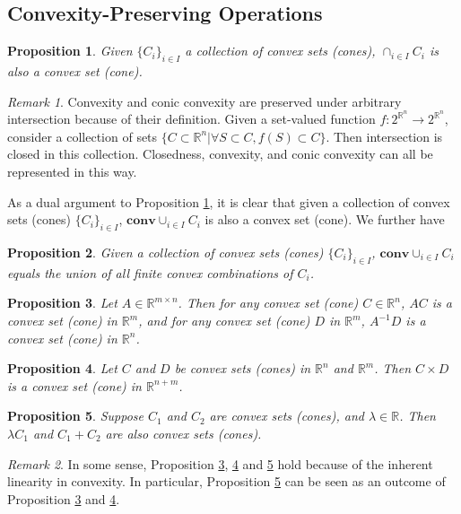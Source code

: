 \documentclass[openany]{book}
\newtheorem{proposition}{Proposition}[chapter]
\theoremstyle{definition}
\theoremstyle{remark}
\newtheorem*{remark}{Remark}
\begin{document}
\subsection{Convexity-Preserving Operations}
\begin{proposition}\label{prop:convIntersect}
    Given $\{C_i\}_{i\in I}$ a collection of convex sets (cones), $\cap_{i\in I}C_i$ is also a convex set (cone).
\end{proposition}
\begin{remark}
    Convexity and conic convexity are preserved under arbitrary intersection because of their definition. Given a set-valued function $f:2^{\mathbb{R}^n}\to2^{\mathbb{R}^n}$, consider a collection of sets $\{C\subset \mathbb{R}^n|\forall S\subset C,f(S)\subset C\}$. Then intersection is closed in this collection. Closedness, convexity, and conic convexity can all be represented in this way.
\end{remark}
As a dual argument to Proposition \ref{prop:convIntersect}, it is clear that given a collection of convex sets (cones) $\{C_i\}_{i\in I}$, $\mathbf{conv}\cup_{i\in I}C_i$ is also a convex set (cone). We further have
\begin{proposition}
    Given a collection of convex sets (cones) $\{C_i\}_{i\in I}$, $\mathbf{conv}\cup_{i\in I}C_i$ equals the union of all finite convex combinations of $C_i$.
\end{proposition}
\begin{proposition}\label{prop:convLinMap}
    Let $A\in \mathbb{R}^{m\times n}$. Then for any convex set (cone) $C\in \mathbb{R}^n$, $AC$ is a convex set (cone) in $\mathbb{R}^m$, and for any convex set (cone) $D$ in $\mathbb{R}^m$, $A^{-1}D$ is a convex set (cone) in $\mathbb{R}^n$.
\end{proposition}
\begin{proposition}\label{prop:convProd}
    Let $C$ and $D$ be convex sets (cones) in $\mathbb{R}^n$ and $\mathbb{R}^m$. Then $C\times D$ is a convex set (cone) in $\mathbb{R}^{n+m}$.
\end{proposition}
\begin{proposition}\label{prop:convLinComb}
    Suppose $C_1$ and $C_2$ are convex sets (cones), and $\lambda\in \mathbb{R}$. Then $\lambda C_1$ and $C_1+C_2$ are also convex sets (cones).
\end{proposition}
\begin{remark}
    In some sense, Proposition \ref{prop:convLinMap},  \ref{prop:convProd} and \ref{prop:convLinComb} hold because of the inherent linearity in convexity. In particular, Proposition \ref{prop:convLinComb} can be seen as an outcome of Proposition \ref{prop:convLinMap} and \ref{prop:convProd}.
\end{remark}
\end{document}
